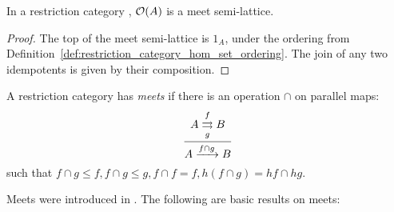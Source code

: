 \begin{lemma}\label{lem:open_a_is_a_meet_semilattice}
  In a restriction category \X, $\mathcal{O}({A})$ is a meet semi-lattice.
\end{lemma}
\begin{proof}
  The top of the meet semi-lattice is $1_A$, under the ordering from
  Definition~\ref{def:restriction_category_hom_set_ordering}.
  The join of any two idempotents is given by their composition.
\end{proof}

\begin{definition}
  A restriction category has \emph{meets} if there is an operation $\cap$ on parallel maps:
  \[
    \infer{A\xrightarrow{f\cap g} B}
      {A\overset{f}{\underset{g}{\rightrightarrows}}B}
  \]
  such that $f\cap g \le f, f\cap g \le g, f\cap f = f, h (f\cap g) = h f \cap h g$.
\end{definition}

Meets were introduced in \cite{cockett-guo-hofstra-2012:range2}.
The following are basic results on meets:


